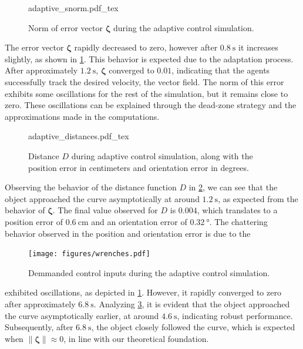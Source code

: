 \begin{figure}[ht]
    \centering
    \def\svgwidth{\linewidth}
    {\footnotesize{adaptive_snorm.pdf_tex}}
    \caption{Norm of error vector $\boldsymbol{\zeta}$ during the adaptive control simulation.}
    \label{fig:sim2-snorm}
\end{figure}
The error vector $\boldsymbol{\zeta}$ rapidly decreased to zero, however after $\qty{0.8}{\second}$ it increases slightly, as shown in \cref{fig:sim2-snorm}. This behavior is expected due to the adaptation process. After approximately $\qty{1.2}{\second}$, $\boldsymbol{\zeta}$ converged to $\num{0.01}$, indicating that the agents successfully track the desired velocity, the vector field. The norm of this error exhibits some oscillations for the rest of the simulation, but it remains close to zero. These oscillations can be explained through the dead-zone strategy and the approximations made in the computations.
\begin{figure}[ht]
    \centering
    \def\svgwidth{\linewidth}
    {\footnotesize{adaptive_distances.pdf_tex}}
    \caption{Distance $D$ during adaptive control simulation, along with the position error in centimeters and orientation error in degrees.}
    \label{fig:sim2-distances}
\end{figure}
Observing the behavior of the distance function $D$ in \cref{fig:sim2-distances}, we can see that the object approached the curve asymptotically at around $\qty{1.2}{\second}$, as expected from the behavior of $\boldsymbol{\zeta}$. The final value observed for $D$ is $\num{0.004}$, which translates to a position error of $\qty{0.6}{\centi\meter}$ and an orientation error of $\qty{0.32}{\degree}$. The chattering behavior observed in the position and orientation error is due to the 
\begin{figure}[htb]
    \centering
    \texttt{[image: figures/wrenches.pdf]}
    \vspace{-1mm}
    \caption{Demmanded control inputs during the adaptive control simulation.}
    \label{fig:sim2-metricvalue}
\end{figure}

exhibited oscillations, as depicted in \cref{fig:sim2-snorm}. However, it rapidly converged to zero after approximately $\qty{6.8}{\second}$. Analyzing \cref{fig:sim2-metricvalue}, it is evident that the object approached the curve asymptotically earlier, at around $\qty{4.6}{\second}$, indicating robust performance. Subsequently, after $\qty{6.8}{\second}$, the object closely followed the curve, which is expected when $\|\boldsymbol{\zeta}\|\approx0$, in line with our theoretical foundation.
